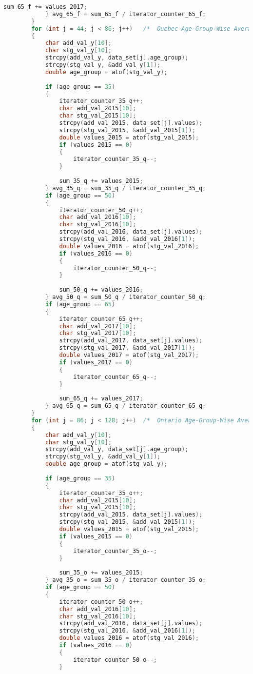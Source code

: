\begin{lstlisting}[language=C, caption=\textit{CPS 188 Term Project Source Code}]
				sum_65_f += values_2017;
			} avg_65_f = sum_65_f / iterator_counter_65_f;
		}
		for (int j = 44; j < 86; j++)	/*	Quebec Age-Group-Wise Average Calculator	*/
		{
			char add_val_y[10];
			char stg_val_y[10];
			strcpy(add_val_y, data_set[j].age_group);
			strcpy(stg_val_y, &add_val_y[1]);
			double age_group = atof(stg_val_y);
			
			if (age_group == 35)
			{
				iterator_counter_35_q++;
				char add_val_2015[10];
				char stg_val_2015[10];
				strcpy(add_val_2015, data_set[j].values);
				strcpy(stg_val_2015, &add_val_2015[1]);
				double values_2015 = atof(stg_val_2015);
				if (values_2015 == 0)
				{
					iterator_counter_35_q--;
				}
				
				sum_35_q += values_2015;
			} avg_35_q = sum_35_q / iterator_counter_35_q;
			if (age_group == 50)
			{
				iterator_counter_50_q++;
				char add_val_2016[10];
				char stg_val_2016[10];
				strcpy(add_val_2016, data_set[j].values);
				strcpy(stg_val_2016, &add_val_2016[1]);
				double values_2016 = atof(stg_val_2016);
				if (values_2016 == 0)
				{
					iterator_counter_50_q--;
				}
				
				sum_50_q += values_2016;
			} avg_50_q = sum_50_q / iterator_counter_50_q;
			if (age_group == 65)
			{
				iterator_counter_65_q++;
				char add_val_2017[10];
				char stg_val_2017[10];
				strcpy(add_val_2017, data_set[j].values);
				strcpy(stg_val_2017, &add_val_2017[1]);
				double values_2017 = atof(stg_val_2017);
				if (values_2017 == 0)
				{
					iterator_counter_65_q--;
				}
				
				sum_65_q += values_2017;
			} avg_65_q = sum_65_q / iterator_counter_65_q;
		}
		for (int j = 86; j < 128; j++)	/*	Ontario Age-Group-Wise Average Calculator	*/
		{
			char add_val_y[10];
			char stg_val_y[10];
			strcpy(add_val_y, data_set[j].age_group);
			strcpy(stg_val_y, &add_val_y[1]);
			double age_group = atof(stg_val_y);
			
			if (age_group == 35)
			{
				iterator_counter_35_o++;
				char add_val_2015[10];
				char stg_val_2015[10];
				strcpy(add_val_2015, data_set[j].values);
				strcpy(stg_val_2015, &add_val_2015[1]);
				double values_2015 = atof(stg_val_2015);
				if (values_2015 == 0)
				{
					iterator_counter_35_o--;
				}
				
				sum_35_o += values_2015;
			} avg_35_o = sum_35_o / iterator_counter_35_o;
			if (age_group == 50)
			{
				iterator_counter_50_o++;
				char add_val_2016[10];
				char stg_val_2016[10];
				strcpy(add_val_2016, data_set[j].values);
				strcpy(stg_val_2016, &add_val_2016[1]);
				double values_2016 = atof(stg_val_2016);
				if (values_2016 == 0)
				{
					iterator_counter_50_o--;
				}
				

\end{lstlisting}
